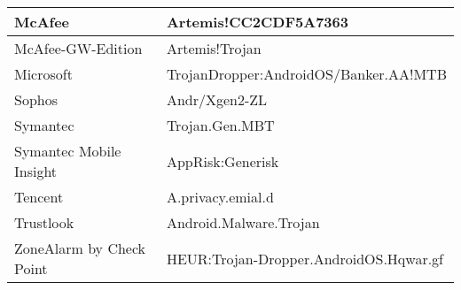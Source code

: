 \begin{tabular}{|l|l|}
    McAfee                   & Artemis!CC2CDF5A7363                   \\ \hline
    McAfee-GW-Edition        & Artemis!Trojan                         \\ \hline
    Microsoft                & TrojanDropper:AndroidOS/Banker.AA!MTB  \\ \hline
    Sophos                   & Andr/Xgen2-ZL                          \\ \hline
    Symantec                 & Trojan.Gen.MBT                         \\ \hline
    Symantec Mobile Insight  & AppRisk:Generisk                       \\ \hline
    Tencent                  & A.privacy.emial.d                      \\ \hline
    Trustlook                & Android.Malware.Trojan                 \\ \hline
    ZoneAlarm by Check Point & HEUR:Trojan-Dropper.AndroidOS.Hqwar.gf \\ \hline
\end{tabular}